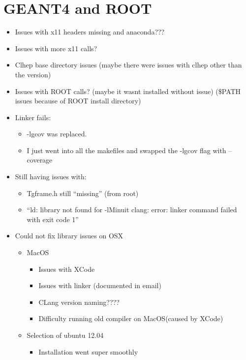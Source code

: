\documentclass[utf8,bachelor,english,draft]{gradu3}
\begin{document}
    \section{GEANT4 and ROOT}
        \begin{itemize}
            \item Issues with x11 headers missing and anaconda???
            \item Issues with more x11 calls?
            \item Clhep base directory issues (maybe there were issues with clhep other than the version)
            \item Issues with ROOT calls? (maybe it wasnt installed without issue) (\$PATH issues because of ROOT install directory)
            \item Linker fails:
            \begin{itemize}
                \item -lgcov was replaced.
                \item I just went into all the makefiles and swapped the -lgcov flag with --coverage
            \end{itemize} 
            \item Still having issues with:
            \begin{itemize}
                \item Tgframe.h still “missing” (from root)
                \item “ld: library not found for -lMinuit
                      clang: error: linker command failed with exit code 1”
            \end{itemize}
            \item Could not fix library issues on OSX
            \begin{itemize}
                \item MacOS
                \begin{itemize}
                    \item Issues with XCode
                    \item Issues with linker (documented in email)
                    \item CLang version naming????
                    \item Difficulty running old compiler on MacOS(caused by XCode)
                \end{itemize}
            \item Selection of ubuntu 12.04
            \begin{itemize}
                \item Installation went super smoothly
            \end{itemize}
            \end{itemize}
        \end{itemize}
        
\end{document}
